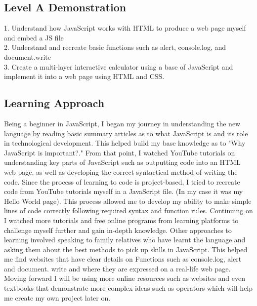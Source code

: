 \documentclass[a4paper, 11pt]{report}
\begin{document}
\subsection{Level A Demonstration}
1. Understand how JavaScript works with HTML to produce a web page myself and embed a JS file  \\ 2. Understand and recreate basic functions such as alert, console.log, and document.write \\ 3. Create a multi-layer interactive calculator using a base of JavaScript and implement it into a web page using HTML and CSS.

\subsection{Learning Approach}
Being a beginner in JavaScript, I began my journey in understanding the new language by reading basic summary articles as to what JavaScript is and its role in technological development.  This helped build my base knowledge as to "Why JavaScript is important?." From that point, I watched YouTube tutorials on understanding key parts of JavaScript such as outputting code into an HTML web page, as well as developing the correct syntactical method of writing the code. Since the process of learning to code is project-based, I tried to recreate code from YouTube tutorials myself in a JavaScript file. (In my case it was my Hello World page). This process allowed me to develop my ability to make simple lines of code correctly following required syntax and function rules. Continuing on I watched more tutorials and free online programs from learning platforms to challenge myself further and gain in-depth knowledge. Other approaches to learning involved speaking to family relatives who have learnt the language and asking them about the best methods to pick up skills in JavaScript. This helped me find websites that have clear details on Functions such as console.log, alert and document. write and where they are expressed on a real-life web page. Moving forward I will be using more online resources such as websites and even textbooks that demonstrate more complex ideas such as operators which will help me create my own project later on.   
\end{document}

